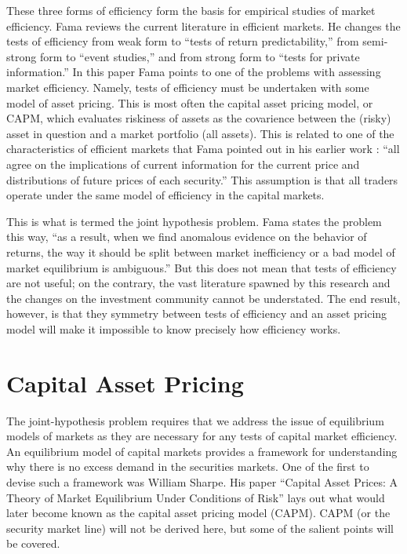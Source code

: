 These three forms of efficiency form the basis for empirical
studies of market efficiency.  Fama \cite{fama91}
reviews the current literature
in efficient markets.  He changes the tests of efficiency from
weak form to ``tests of return predictability,'' from semi-strong
form
to
``event studies,'' and from strong form to ``tests for private
information.''
In this paper Fama points to one of the problems with assessing
market efficiency.  Namely, tests of efficiency
must be undertaken with some model of asset pricing.
This is most often the capital asset pricing model, or CAPM, which
evaluates riskiness of assets as the covarience between the
(risky) asset in
question and a market portfolio (all assets).
This is related to one of the characteristics 
of efficient markets that Fama pointed out in his earlier
work \cite{fama70}: ``all agree on the implications of current 
information for the current
price and distributions of future prices of each security.'' 
This assumption is that all traders operate under the same model of
efficiency in the capital markets.

This is what is termed the joint
hypothesis problem.  Fama states the problem
this way, ``as a result, when we find anomalous evidence on the
behavior of returns, the way it should be split between market
inefficiency or a bad model of market equilibrium is
ambiguous.'' \cite{fama91}  But
this does not mean that tests of efficiency are not useful; on the
contrary, the vast literature spawned by this research and the
changes
on the investment community cannot be understated.  The end result,
however, is that they symmetry between tests of efficiency and an
asset pricing model will make it impossible to know precisely how
efficiency works.

\section{Capital Asset Pricing}

The joint-hypothesis problem requires that we address the
issue of equilibrium models of markets as they are
necessary for any tests of capital market efficiency.  An
equilibrium model
of capital markets provides a framework for understanding
why there is no excess demand in the securities markets.
One of the first to devise such a framework 
was William Sharpe.  His paper ``Capital Asset Prices:  A
Theory of Market Equilibrium Under Conditions of Risk'' 
\cite{sharpe64} lays
out what would later become known as the capital asset
pricing model (CAPM).  CAPM (or the security market line)
will not be derived here, but some of the salient points
will be covered.

